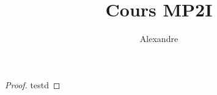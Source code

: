 \documentclass[12pt,a4paper]{article}
\title{Cours MP2I}
\author{Alexandre}
\date{}
\begin{document}
\setcounter{page}{0}
\maketitle

\begin{proof}
    testd
\end{proof}

\tableofcontents
\newpage

%
%
%

\end{document}
